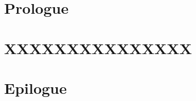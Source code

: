 \documentclass[a4paper,twoside,symmetric,dropfolio,euler,sidecite]{unicam-diss}
\begin{document}
\frontmatter
{}








\mainmatter
{}
\part{Prologue}



\part{XXXXXXXXXXXXXXX}


\part{Epilogue}



\backmatter
\printunsrtglossary[type=abbreviations]
\printnomenclature
\printbibliography

\end{document}
